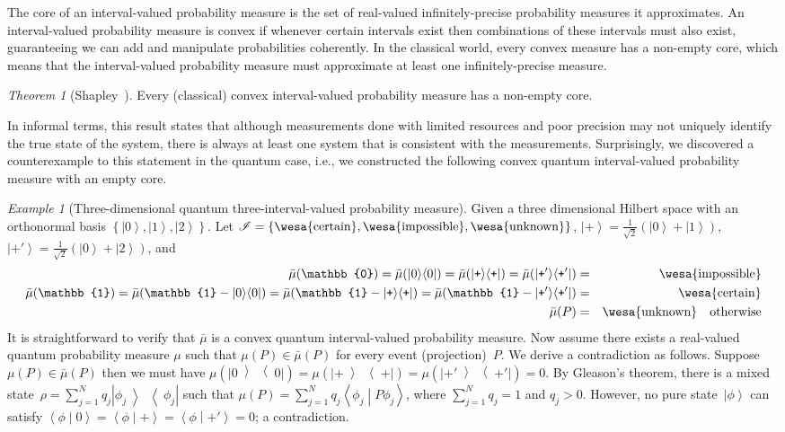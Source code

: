 \documentclass{article}
\theoremstyle{remark}
\newtheorem{example}{Example}
\newtheorem{thm}{Theorem}
\newcommand{\imposs}{{\mbox{\wesa{impossible}}}}
\newcommand{\necess}{{\mbox{\wesa{certain}}}}
\newcommand{\unknown}{{\mbox{\wesa{unknown}}}}
\newcommand{\ket}[1]{{\left\vert{#1}\right\rangle}}
\newcommand{\op}[2]{\ensuremath{\left\vert{#1}\middle\rangle\middle\langle{#2}\right\vert}}
\newcommand{\proj}[1]{\op{#1}{#1}}
\newcommand{\ps}{\texttt{+}}
\newcommand{\ip}[2]{\ensuremath{\left\langle{#1}\middle\vert{#2}\right\rangle}}
\begin{document}
\noindent The core of an interval-valued probability measure is the
set of real-valued infinitely-precise probability measures it
approximates. An interval-valued probability measure is convex if
whenever certain intervals exist then combinations of these intervals
must also exist, guaranteeing we can add and manipulate probabilities
coherently. In the classical world, every convex measure has a
non-empty core, which means that the interval-valued probability
measure must approximate at least one infinitely-precise measure.

\begin{thm}[Shapley~\cite{Shapley1971,,Grabisch2016}]\label{thm:Shapley}
  Every (classical) convex interval-valued probability measure has a
  non-empty core.
\end{thm}

In informal terms, this result states that although measurements done
with limited resources and poor precision may not uniquely identify
the true state of the system, there is always at least one system that
is consistent with the measurements. Surprisingly, we discovered a
counterexample to this statement in the quantum case, i.e., we
constructed the following convex quantum interval-valued probability
measure with an empty core.

\begin{example}[Three-dimensional quantum three-interval-valued 
  probability measure]\label{ex:three-dimensional-three-value} Given
  a three dimensional Hilbert space with an orthonormal basis
  $\left\{ \ket{0},\ket{1},\ket{2}\right\} $.  Let \emph{
    $\mathscr{I}=\left\{ \necess,\imposs,\unknown\right\} $},
  $\ket{\ps}=\frac{1}{\sqrt{2}}(\ket{0}+\ket{1})$,
  $\ket{\ps'}=\frac{1}{\sqrt{2}}(\ket{0}+\ket{2})$, and
\begin{eqnarray*}
\bar{\mu}(\mathbb{0})=\bar{\mu}(\proj{0})=\bar{\mu}(\proj{\ps})=\bar{\mu}(\proj{\ps'})
  &=& \imposs\\
\bar{\mu}(\mathbb{1})=\bar{\mu}(\mathbb{1}-\proj{0})=\bar{\mu}(\mathbb{1}-\proj{\ps})=\bar{\mu}(\mathbb{1}-\proj{\ps'})
  &=& \necess \\
\bar{\mu}(P) 
  &=& \unknown\quad\textrm{otherwise}
\end{eqnarray*}
It is straightforward to verify that $\bar{\mu}$ is a convex quantum
interval-valued probability measure. Now assume there exists a
real-valued quantum probability measure $\mu$ such that
$\mu(P)\in\bar{\mu}(P)$ for every event (projection)~$P$. We derive a
contradiction as follows. Suppose $\mu(P)\in\bar{\mu}(P)$ then we must
have $\mu(\proj{0})=\mu(\proj{\ps})=\mu(\proj{\ps'})=0$. By Gleason's
theorem, there is a mixed
state~$\rho=\sum_{j=1}^{N}q_{j}\proj{\phi_{j}}$ such that
$\mu\left(P\right)=\sum_{j=1}^{N}q_{j}\ip{\phi_{j}}{P\phi_{j}}$, where
$\sum_{j=1}^{N}q_{j}=1$ and $q_{j}>0$.  However, no pure
state~$\ket{\phi}$ can satisfy
$\ip{\phi}{0}=\ip{\phi}{\ps}=\ip{\phi}{\ps'}=0$; a contradiction.
\end{example}
\end{document}
